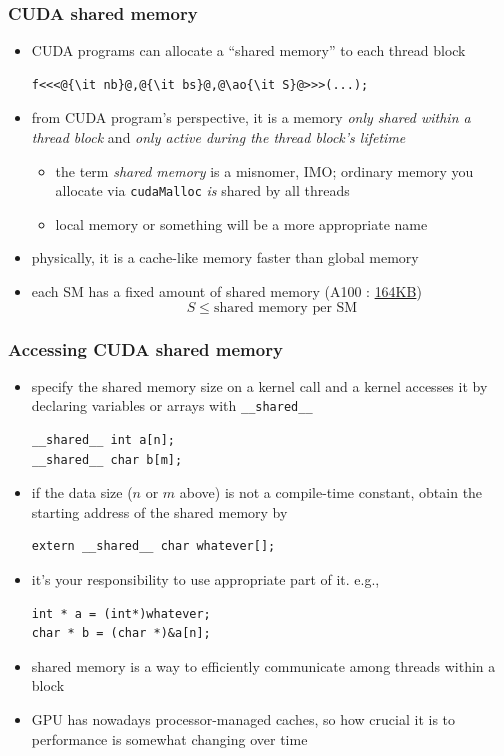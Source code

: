 \documentclass[12pt,dvipdfmx]{beamer}
\newcommand{\ao}[1]{{\color{blue}#1}}
\begin{document}
\begin{frame}[fragile]
  \frametitle{CUDA shared memory}
  \begin{itemize}
  \item CUDA programs can allocate a ``shared memory'' to each thread block

\begin{lstlisting}
f<<<@{\it nb}@,@{\it bs}@,@\ao{\it S}@>>>(...);
\end{lstlisting}

\item from CUDA program's perspective, it is a memory \ao{\it only shared within a thread block} and
  {\it only active during the thread block's lifetime}
  \begin{itemize}
  \item the term \ao{\it shared memory} is a misnomer, IMO;
    ordinary memory you allocate via {\tt cudaMalloc}
    {\it is} shared by all threads
  \item local memory or something will be a more appropriate name
  \end{itemize}
  
\item physically, it is a cache-like memory faster than global memory

\item each SM has a fixed amount of shared memory
  (A100 : \href{https://docs.nvidia.com/cuda/ampere-tuning-guide/index.html#sm-occupancy}{164KB})
  \[ S \leq \mbox{shared memory per SM} \]
  \end{itemize}
\end{frame}

\begin{frame}[fragile]
  \frametitle{Accessing CUDA shared memory}
  \begin{itemize}
  \item specify the shared memory size on a kernel call and 
    a kernel accesses it by declaring variables or arrays with
    \ao{\tt \_\_shared\_\_}
\begin{lstlisting}
__shared__ int a[n];
__shared__ char b[m];
\end{lstlisting}
\item if the data size ($n$ or $m$ above) is not a compile-time constant,
  obtain the starting address of the shared memory by
\begin{lstlisting}
extern __shared__ char whatever[];
\end{lstlisting}
\item it's your responsibility to use appropriate part of it. e.g.,
\begin{lstlisting}
int * a = (int*)whatever;
char * b = (char *)&a[n];
\end{lstlisting}
\item shared memory is a way to efficiently communicate among threads within a block
\item GPU has nowadays processor-managed caches,
  so how crucial it is to performance is somewhat changing over time
\end{itemize}
\end{frame}
\end{document}
